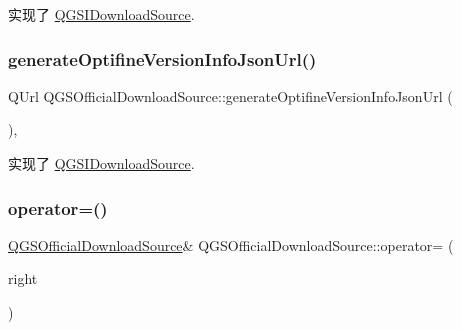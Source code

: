 实现了 \mbox{\hyperlink{class_q_g_s_i_download_source_a123c772c2a3f8431a96f676bc0e4cc91}{Q\+G\+S\+I\+Download\+Source}}.

\mbox{\label{class_q_g_s_official_download_source_a32b22d324a98de1863d1da57066f4ac1}} 
\subsubsection{\texorpdfstring{generate\+Optifine\+Version\+Info\+Json\+Url()}{generateOptifineVersionInfoJsonUrl()}}
{\footnotesize\ttfamily Q\+Url Q\+G\+S\+Official\+Download\+Source\+::generate\+Optifine\+Version\+Info\+Json\+Url (\begin{DoxyParamCaption}{ }\end{DoxyParamCaption})\hspace{0.3cm}{\ttfamily [override]}, {\ttfamily [virtual]}}



实现了 \mbox{\hyperlink{class_q_g_s_i_download_source_a206fb5382716c8f34070eae836f9b742}{Q\+G\+S\+I\+Download\+Source}}.

\mbox{\label{class_q_g_s_official_download_source_a4c5c518cc098a9d14a21312b5f5b6c5a}} 
\subsubsection{\texorpdfstring{operator=()}{operator=()}\hspace{0.1cm}{\footnotesize\ttfamily [1/2]}}
{\footnotesize\ttfamily \mbox{\hyperlink{class_q_g_s_official_download_source}{Q\+G\+S\+Official\+Download\+Source}}\& Q\+G\+S\+Official\+Download\+Source\+::operator= (\begin{DoxyParamCaption}\item[{const \mbox{\hyperlink{class_q_g_s_official_download_source}{Q\+G\+S\+Official\+Download\+Source}} \&}]{right }\end{DoxyParamCaption})\hspace{0.3cm}{\ttfamily [delete]}}

